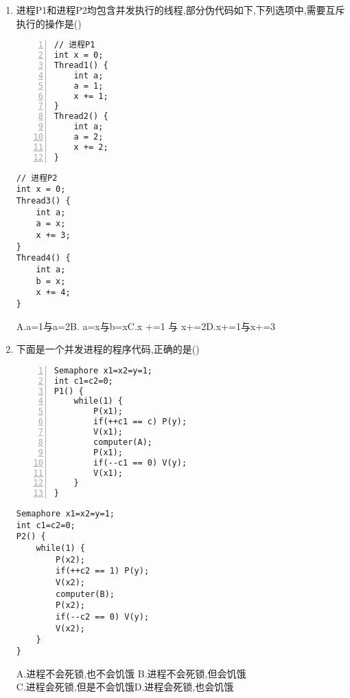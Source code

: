 \documentclass[12pt, a4paper, oneside, UTF8]{ctexbook}
\begin{document}
\begin{enumerate}
    \item 进程P1和进程P2均包含并发执行的线程,部分伪代码如下,下列选项中,需要互斥执行的操作是() 
    \begin{center}
        \begin{minipage}[t]{0.45\textwidth}
\begin{lstlisting}[numbers=left]
// 进程P1                    
int x = 0;                   
Thread1() {                  
    int a;
    a = 1;
    x += 1;
}
Thread2() {
    int a;
    a = 2;
    x += 2;
}
\end{lstlisting}
        \end{minipage}
        \hfill
        \begin{minipage}[t]{0.45\textwidth}
\begin{lstlisting}
// 进程P2                    
int x = 0;                   
Thread3() {                  
    int a;
    a = x;
    x += 3;
}
Thread4() {
    int a;
    b = x;
    x += 4;
}
\end{lstlisting}
        \end{minipage}
    \end{center}

    A.a=1与a=2\qquad B. a=x与b=x\qquad C.x +=1 与 x+=2\qquad D.x+=1与x+=3
    \item 下面是一个并发进程的程序代码,正确的是() 
    \begin{center}
        \begin{minipage}[t]{0.45\textwidth}
            \begin{lstlisting}[numbers=left]
Semaphore x1=x2=y=1;
int c1=c2=0;
P1() {
    while(1) {
        P(x1);
        if(++c1 == c) P(y);
        V(x1);
        computer(A);
        P(x1);
        if(--c1 == 0) V(y);
        V(x1);
    }
}
                \end{lstlisting}
            \end{minipage}
            \hfil
            \begin{minipage}[t]{0.45\textwidth}
                \begin{lstlisting}
Semaphore x1=x2=y=1;
int c1=c2=0;
P2() {
    while(1) {
        P(x2);
        if(++c2 == 1) P(y);
        V(x2);
        computer(B);
        P(x2);
        if(--c2 == 0) V(y);
        V(x2);
    }
}
            \end{lstlisting}
        \end{minipage}
    \end{center}
A.进程不会死锁,也不会饥饿 \qquad B.进程不会死锁,但会饥饿 \\
C.进程会死锁,但是不会饥饿\qquad D.进程会死锁,也会饥饿 


\end{enumerate}
\end{document}
